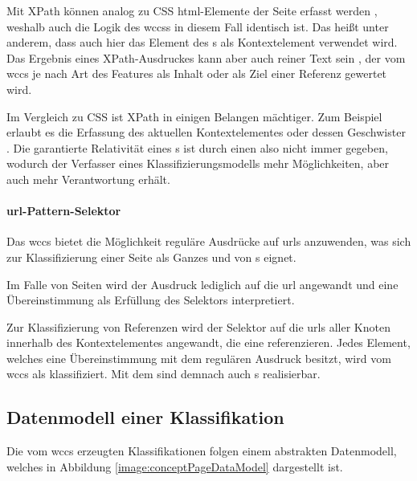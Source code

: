         Mit XPath können analog zu CSS \gls{html}-Elemente der Seite erfasst werden
        \cite{w3c:xpath},
        weshalb auch die Logik des \glspl{wccs} in diesem Fall identisch ist.
        Das heißt unter anderem, dass auch hier das Element des {\parentFeature}s
        als Kontextelement verwendet wird.
        Das Ergebnis eines XPath-Ausdruckes kann aber auch reiner Text sein
        \cite{w3c:xpath},
        der vom \gls{wccs} je nach Art des Features als Inhalt oder als Ziel einer
        Referenz gewertet wird.

        Im Vergleich zu CSS ist XPath in einigen Belangen mächtiger.
        Zum Beispiel erlaubt es die Erfassung des aktuellen Kontextelementes
        oder dessen Geschwister \cite{w3c:xpath}.
        Die garantierte Relativität eines {\cssSelector}s ist durch
        einen {\xpathSelector} also nicht immer gegeben,
        wodurch der Verfasser eines Klassifizierungsmodells mehr Möglichkeiten,
        aber auch mehr Verantwortung erhält.

        \paragraph{\gls{url}-Pattern-Selektor}
        Das \gls{wccs} bietet die Möglichkeit reguläre Ausdrücke auf \glspl{url} anzuwenden,
        was sich zur Klassifizierung einer Seite als Ganzes und von {}s eignet.

        Im Falle von Seiten wird der Ausdruck lediglich auf die \gls{url} angewandt
        und eine Übereinstimmung als Erfüllung des Selektors interpretiert.       
        
        Zur Klassifizierung von Referenzen wird der Selektor auf die \glspl{url} aller Knoten
        innerhalb des Kontextelementes angewandt, die eine {\resource} referenzieren.
        Jedes Element, welches eine Übereinstimmung mit dem regulären Ausdruck besitzt,
        wird vom \gls{wccs} als {} klassifiziert.
        Mit dem {\urlSelector} sind demnach auch {\collectionFeature}s realisierbar.


    \subsection{Datenmodell einer Klassifikation}
        \label{section:conceptPageDataModel}
        Die vom \gls{wccs} erzeugten Klassifikationen folgen einem abstrakten Datenmodell,
        welches in Abbildung \ref{image:conceptPageDataModel} dargestellt ist.

